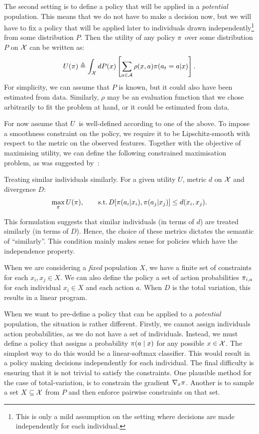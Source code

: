 {  The second setting is to define a policy that will be applied in a
  \emph{potential} population. This means that we do not have to make a
  decision now, but we will have to fix a policy that will be applied
  later to individuals drawn independently\footnote{This is only a mild assumption on the setting where decisions are made independently for each individual.} from some distribution
  $P$. Then the utility of any policy $\pi$ over some distribution $P$
  on ${\mathcal{X}}$ can be written as:
  \begin{equation}
    U(\pi) \mathrel{\triangleq} \int_{{\mathcal{X}}} dP(x) \left[\sum_{a \in {\mathcal{A}}} \rho(x, a) \pi(a_t = a | x)\right].
    \label{eq:distribution-policy}
  \end{equation}
  For simplicity, we can assume that $P$ is known, but it could also have been estimated from data. Similarly, $\rho$ may be an evaluation function that we chose arbitrarily to fit the problem at hand, or it could be estimated from data.
  
  For now assume that $U$ is well-defined according to one of the above. To impose a smoothness constraint on the policy, we require it to be Lipschitz-smooth with respect to the metric on the observed features. Together with the objective of maximising utility, we can define the following constrained maximisation problem, as was suggested by~\citet{dwork2012fairness}:
  \begin{block}{Treating similar individuals similarly.}
    For a given utility $U$, metric $d$ on ${\mathcal{X}}$ and divergence $D$:
    \begin{equation}
      \max_\pi  U(\pi), \qquad
      \mathop{\rm s.t.}  D[\pi(a_i | x_i), \pi(a_j | x_j)] \leq d(x_i,x_j). 
      \label{eq:lipschitz-fairness}
    \end{equation}
  \end{block}
  This formulation suggests that similar individuals (in terms of $d$) are treated similarly (in terms of $D$). Hence, the choice of these metrics dictates the semantic of ``similarly''. This condition mainly makes sense for policies which have the independence property.

  When we are considering a \emph{fixed} population $X$, we have a finite set of constraints for each $x_i, x_j \in X$. We can also define the policy a set of action probabilities $\pi_{i,a}$ for each individual $x_i \in X$ and each action $a$. When $D$ is the total variation, this results in a linear program.

  When we want to pre-define a policy that can be applied to a \emph{potential} population, the situation is rather different. Firstly, we cannot assign individuals action probabilities, as we do not have a set of individuals. Instead, we must define a policy that assigns a probability $\pi(a \mid x)$ for any possible $x \in {\mathcal{X}}$. The simplest way to do this would be a linear-softmax classifier. This would result in a policy making decisions independently for each individual. The final difficulty is ensuring that it is not trivial to satisfy the constraints. One plausible method for the case of total-variation, is to constrain the gradient $\nabla_x \pi$. Another is to sample a set $X \subseteq {\mathcal{X}}$ from $P$ and then enforce pairwise constraints on that set.
  
}
